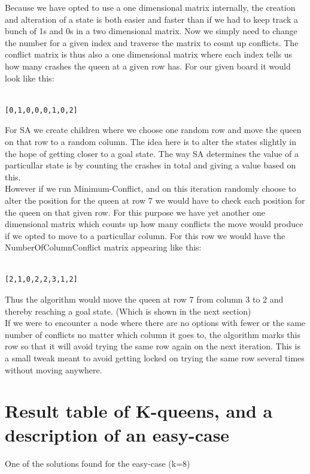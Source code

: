 \documentclass[12pt, a4paper]{article}
\begin{document}
\noindent
Because we have opted to use a one dimensional matrix internally, the creation and alteration of a state is both easier and faster than if we had to keep track a bunch of 1s and 0s in a two dimensional matrix. Now we simply need to change the number for a given index and traverse the matrix to count up conflicts. The conflict matrix is thus also a one dimensional matrix where each index tells us how many crashes the queen at a given row has. For our given board it would look like this:

\begin{verbatim}

[0,1,0,0,0,1,0,2]

\end{verbatim}

\noindent
For SA we create children where we choose one random row and move the queen on that row to a random column. The idea here is to alter the states slightly in the hope of getting closer to a goal state. The way SA determines the value of a particullar state is by counting the crashes in total and giving a value based on this. 
\\
However if we run Minimum-Conflict, and on this iteration randomly choose to alter the position for the queen at row 7 we would have to check each position for the queen on that given row. For this purpose we have yet another one dimensional matrix which counts up how many conflicts the move would produce if we opted to move to a particullar column. For this row we would have the NumberOfColumnConflict matrix appearing like this:

\begin{verbatim}

[2,1,0,2,2,3,1,2]

\end{verbatim}
\noindent
Thus the algorithm would move the queen at row 7 from column 3 to 2 and thereby reaching a goal state. (Which is shown in the next section)
\\
If we were to encounter a node where there are no options with fewer or the same number of conflicts no matter which column it goes to, the algorithm marks this row so that it will avoid trying the same row again on the next iteration. This is a small tweak meant to avoid getting locked on trying the same row several times without moving anywhere. 

\section{Result table of K-queens, and a description of an easy-case}
One of the solutions found for the easy-case (k=8)
\end{document}
